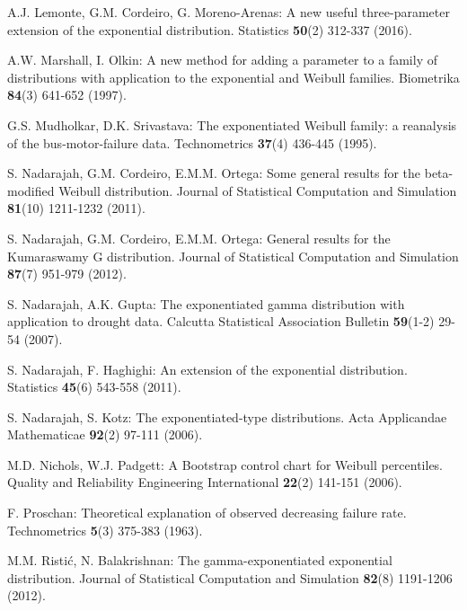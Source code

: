 \documentclass[12pt,a4paper]{article} %
\begin{document}
\begin{description}
\item
A.J. Lemonte, G.M. Cordeiro, G. Moreno-Arenas:
A new useful three-parameter extension of the exponential distribution.
Statistics {\bf 50}(2) 312-337 (2016).

\item
A.W. Marshall, I. Olkin:
A new method for adding a parameter to a family of distributions with
application to the exponential and Weibull families.
Biometrika {\bf 84}(3) 641-652 (1997).

\item
G.S. Mudholkar, D.K. Srivastava:
The exponentiated Weibull family: a reanalysis of the bus-motor-failure data.
Technometrics {\bf 37}(4) 436-445 (1995).

\item
S. Nadarajah, G.M. Cordeiro, E.M.M. Ortega:
Some general results for the beta-modified Weibull distribution.
Journal of Statistical Computation and Simulation {\bf 81}(10) 1211-1232 (2011).

\item
S. Nadarajah, G.M. Cordeiro, E.M.M. Ortega:
General results for the Kumaraswamy G distribution.
Journal of Statistical Computation and Simulation {\bf 87}(7) 951-979 (2012).

\item
S. Nadarajah, A.K. Gupta:
The exponentiated gamma distribution with application to drought data.
Calcutta Statistical Association Bulletin {\bf 59}(1-2) 29-54 (2007).

\item
S. Nadarajah, F. Haghighi:
An extension of the exponential distribution.
Statistics {\bf 45}(6) 543-558 (2011).

\item
S. Nadarajah, S. Kotz:
The exponentiated-type distributions.
Acta Applicandae Mathematicae {\bf 92}(2) 97-111 (2006).

\item
M.D. Nichols, W.J. Padgett:
A Bootstrap control chart for Weibull percentiles.
Quality and Reliability Engineering International {\bf 22}(2) 141-151 (2006).

\item
F. Proschan:
Theoretical explanation of observed decreasing failure rate.
Technometrics {\bf 5}(3) 375-383 (1963).

\item
M.M. Risti\'{c}, N. Balakrishnan:
The gamma-exponentiated exponential distribution.
Journal of Statistical Computation and Simulation {\bf 82}(8) 1191-1206 (2012).


\end{description}
\end{document}
